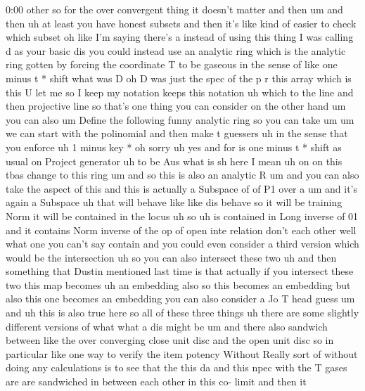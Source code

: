 \begin{unfinished}{0:00}
other  so  for  the  over  convergent  thing
it  doesn't  matter  and  then  um  and  then
uh  at  least  you  have  honest  subsets  and
then  it's  like  kind  of  easier  to  check
which  subset  oh  like  I'm  saying  there's
a  instead  of  using  this  thing  I  was
calling  d  as  your  basic  dis  you  could
instead  use  an  analytic  ring  which  is
the  analytic  ring  gotten  by  forcing  the
coordinate  T  to  be  gaseous  in  the  sense
of  like  one  minus  t  *  shift  what  was  D
oh  D  was  just  the  spec  of  the  p
r  this  array  which  is  this  U  let  me  so  I
keep  my  notation  keeps  this
notation  uh  which  to  the  line  and  then
projective  line  so  that's  one  thing  you
can  consider  on  the  other  hand  um  you
can  also
um  Define  the  following  funny  analytic
ring  so  you  can  take
um
um  we  can  start  with  the
polinomial  and  then  make  t  guessers  uh
in  the  sense  that  you  enforce  uh  1  minus
key
*  oh  sorry  uh  yes  and  for  is  one  minus  t
*  shift  as  usual  on  Project  generator  uh
to
be
Aus  what  is  sh  here  I  mean  uh
on  on  this  tbas  change  to  this
ring
um  and  so  this  is  also  an  analytic
R
um  and  you  can  also  take  the  aspect  of
this
and  this  is
actually  a  Subspace  of  of  P1  over  a
um  and  it's  again  a  Subspace  uh  that
will  behave  like  like  dis  behave  so  it
will  be  training  Norm  it  will  be
contained  in  the  locus
uh  so
uh  is  contained
in  Long  inverse  of
01  and  it
contains  Norm  inverse  of  the  op  of  open
inte
relation  don't  each  other
well  what  one  you  can't  say  contain  and
you  could  even  consider  a  third  version
which  would  be  the  intersection  uh  so
you  can  also  intersect  these  two  uh  and
then  something  that  Dustin  mentioned
last  time  is  that  actually  if  you
intersect  these  two  this  map
becomes
uh  an  embedding
also  so  this  becomes  an  embedding  but
also  this  one  becomes  an  embedding  you
can  also  consider  a  Jo  T
head
guess  um
and  uh  this  is  also  true  here  so  all  of
these  three  things  uh  there  are  some
slightly  different  versions  of  what  what
a  dis  might  be  um  and  there  also
sandwich  between  like  the  over
converging  close  unit  disc  and  the  open
unit
disc
so  in  particular  like  one  way  to  verify
the  item  potency  Without  Really  sort  of
without  doing  any  calculations  is  to  see
that  the  this  da  and  this  npec  with  the
T  gases  are  are  sandwiched  in  between
each  other  in  this  co-  limit  and  then  it

\end{unfinished}
